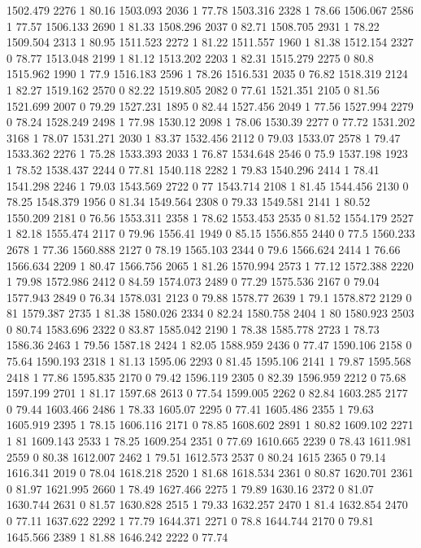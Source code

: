 1502.479	2276	1	80.16
1503.093	2036	1	77.78
1503.316	2328	1	78.66
1506.067	2586	1	77.57
1506.133	2690	1	81.33
1508.296	2037	0	82.71
1508.705	2931	1	78.22
1509.504	2313	1	80.95
1511.523	2272	1	81.22
1511.557	1960	1	81.38
1512.154	2327	0	78.77
1513.048	2199	1	81.12
1513.202	2203	1	82.31
1515.279	2275	0	80.8
1515.962	1990	1	77.9
1516.183	2596	1	78.26
1516.531	2035	0	76.82
1518.319	2124	1	82.27
1519.162	2570	0	82.22
1519.805	2082	0	77.61
1521.351	2105	0	81.56
1521.699	2007	0	79.29
1527.231	1895	0	82.44
1527.456	2049	1	77.56
1527.994	2279	0	78.24
1528.249	2498	1	77.98
1530.12	2098	1	78.06
1530.39	2277	0	77.72
1531.202	3168	1	78.07
1531.271	2030	1	83.37
1532.456	2112	0	79.03
1533.07	2578	1	79.47
1533.362	2276	1	75.28
1533.393	2033	1	76.87
1534.648	2546	0	75.9
1537.198	1923	1	78.52
1538.437	2244	0	77.81
1540.118	2282	1	79.83
1540.296	2414	1	78.41
1541.298	2246	1	79.03
1543.569	2722	0	77
1543.714	2108	1	81.45
1544.456	2130	0	78.25
1548.379	1956	0	81.34
1549.564	2308	0	79.33
1549.581	2141	1	80.52
1550.209	2181	0	76.56
1553.311	2358	1	78.62
1553.453	2535	0	81.52
1554.179	2527	1	82.18
1555.474	2117	0	79.96
1556.41	1949	0	85.15
1556.855	2440	0	77.5
1560.233	2678	1	77.36
1560.888	2127	0	78.19
1565.103	2344	0	79.6
1566.624	2414	1	76.66
1566.634	2209	1	80.47
1566.756	2065	1	81.26
1570.994	2573	1	77.12
1572.388	2220	1	79.98
1572.986	2412	0	84.59
1574.073	2489	0	77.29
1575.536	2167	0	79.04
1577.943	2849	0	76.34
1578.031	2123	0	79.88
1578.77	2639	1	79.1
1578.872	2129	0	81
1579.387	2735	1	81.38
1580.026	2334	0	82.24
1580.758	2404	1	80
1580.923	2503	0	80.74
1583.696	2322	0	83.87
1585.042	2190	1	78.38
1585.778	2723	1	78.73
1586.36	2463	1	79.56
1587.18	2424	1	82.05
1588.959	2436	0	77.47
1590.106	2158	0	75.64
1590.193	2318	1	81.13
1595.06	2293	0	81.45
1595.106	2141	1	79.87
1595.568	2418	1	77.86
1595.835	2170	0	79.42
1596.119	2305	0	82.39
1596.959	2212	0	75.68
1597.199	2701	1	81.17
1597.68	2613	0	77.54
1599.005	2262	0	82.84
1603.285	2177	0	79.44
1603.466	2486	1	78.33
1605.07	2295	0	77.41
1605.486	2355	1	79.63
1605.919	2395	1	78.15
1606.116	2171	0	78.85
1608.602	2891	1	80.82
1609.102	2271	1	81
1609.143	2533	1	78.25
1609.254	2351	0	77.69
1610.665	2239	0	78.43
1611.981	2559	0	80.38
1612.007	2462	1	79.51
1612.573	2537	0	80.24
1615	2365	0	79.14
1616.341	2019	0	78.04
1618.218	2520	1	81.68
1618.534	2361	0	80.87
1620.701	2361	0	81.97
1621.995	2660	1	78.49
1627.466	2275	1	79.89
1630.16	2372	0	81.07
1630.744	2631	0	81.57
1630.828	2515	1	79.33
1632.257	2470	1	81.4
1632.854	2470	0	77.11
1637.622	2292	1	77.79
1644.371	2271	0	78.8
1644.744	2170	0	79.81
1645.566	2389	1	81.88
1646.242	2222	0	77.74
